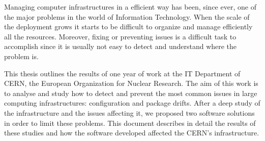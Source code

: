
Managing computer infrastructures in a efficient way has been, since ever,
one of the major problems in the world of Information Technology. When the
scale of the deployment grows it starts to be difficult to organize and
manage efficiently all the resources. Moreover, fixing or preventing
issues is a difficult task to accomplish since it is usually not easy to
detect and understand where the problem is.

This thesis outlines the results of one year of work at the IT Department
of CERN, the European Organization for Nuclear Research. The aim of this
work is to analyse and study how to detect and prevent the most common
issues in large computing infrastructures: configuration and package
drifts. After a deep study of the infrastructure and the issues affecting
it, we proposed two software solutions in order to limit these problems.
This document describes in detail the results of these studies and how the
software developed affected the CERN's infrastructure.


